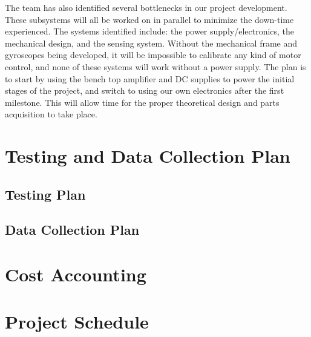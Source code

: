 \documentclass[11pt]{report}
\begin{document}
\begin{spacing}{1.5}
The team has also identified several bottlenecks in our project development. These subsystems will all be worked on in parallel to minimize the down-time experienced. The systems identified include: the power supply/electronics, the mechanical design, and the sensing system. Without the mechanical frame and gyroscopes being developed, it will be impossible to calibrate any kind of motor control, and none of these systems will work without a power supply. The plan is to start by using the bench top amplifier and DC supplies to power the initial stages of the project, and switch to using our own electronics after the first milestone. This will allow time for the proper theoretical design and parts acquisition to take place.  

\section*{Testing and Data Collection Plan} %

\subsection*{Testing Plan}

\subsection*{Data Collection Plan}

\section*{Cost Accounting} %

\section*{Project Schedule} %

{}




\end{spacing}
\end{document}
